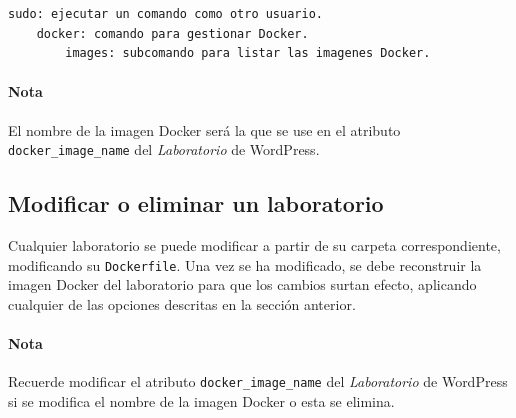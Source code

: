 \begin{appendices}
                    \begin{lstlisting}[style=comment_style]
    sudo: ejecutar un comando como otro usuario.
    docker: comando para gestionar Docker.
        images: subcomando para listar las imagenes Docker.
                    \end{lstlisting}

                    \paragraph{Nota}

                        El nombre de la imagen Docker será la que se use en el atributo \texttt{docker\_image\_name} del \textit{Laboratorio} de WordPress.

            \subsection{Modificar o eliminar un laboratorio}

                Cualquier laboratorio se puede modificar a partir de su carpeta correspondiente, modificando su \texttt{Dockerfile}. Una vez se ha modificado, se debe reconstruir la imagen Docker del laboratorio para que los cambios surtan efecto, aplicando cualquier de las opciones descritas en la sección anterior.

                \paragraph{Nota}

                    Recuerde modificar el atributo \texttt{docker\_image\_name} del \textit{Laboratorio} de WordPress si se modifica el nombre de la imagen Docker o esta se elimina.

                
\end{appendices}
